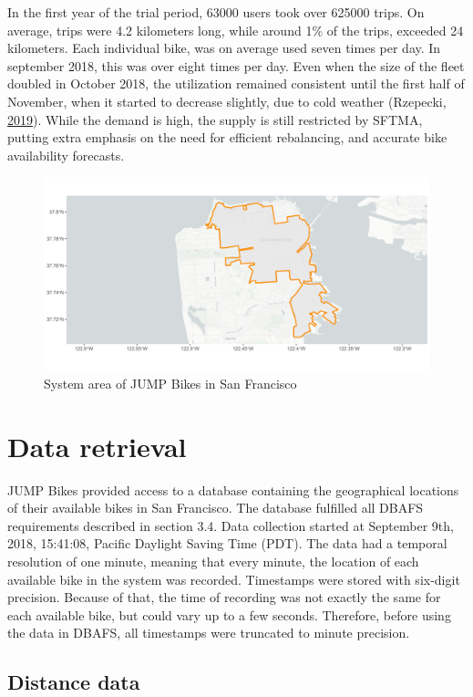 \documentclass[12pt,oneside]{reedthesis}
\begin{document}
In the first year of the trial period, 63000 users took over 625000
trips. On average, trips were 4.2 kilometers long, while around 1\% of
the trips, exceeded 24 kilometers. Each individual bike, was on average
used seven times per day. In september 2018, this was over eight times
per day. Even when the size of the fleet doubled in October 2018, the
utilization remained consistent until the first half of November, when
it started to decrease slightly, due to cold weather (Rzepecki,
\protect\hyperlink{ref-jump2019}{2019}). While the demand is high, the
supply is still restricted by SFTMA, putting extra emphasis on the need
for efficient rebalancing, and accurate bike availability forecasts.
\begin{figure}[h]
\includegraphics[width=\textwidth]{Figures/systemarea} \caption{System area of JUMP Bikes in San Francisco}\label{fig:systemarea}
\end{figure}
\section{Data retrieval}\label{data-retrieval}

JUMP Bikes provided access to a database containing the geographical
locations of their available bikes in San Francisco. The database
fulfilled all DBAFS requirements described in section 3.4. Data
collection started at September 9th, 2018, 15:41:08, Pacific Daylight
Saving Time (PDT). The data had a temporal resolution of one minute,
meaning that every minute, the location of each available bike in the
system was recorded. Timestamps were stored with six-digit precision.
Because of that, the time of recording was not exactly the same for each
available bike, but could vary up to a few seconds. Therefore, before
using the data in DBAFS, all timestamps were truncated to minute
precision.

\subsection{Distance data}\label{distance-data-1}
\end{document}
